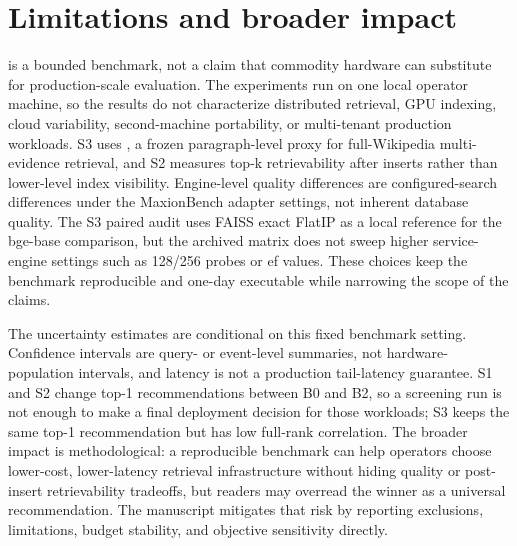 \section{Limitations and broader impact}

\sys is a bounded benchmark, not a claim that commodity hardware can substitute for production-scale evaluation. The experiments run on one local operator machine, so the results do not characterize distributed retrieval, GPU indexing, cloud variability, second-machine portability, or multi-tenant production workloads. S3 uses \hotpotmaxionbench{}, a frozen paragraph-level proxy for full-Wikipedia multi-evidence retrieval, and S2 measures top-k retrievability after inserts rather than lower-level index visibility. Engine-level quality differences are configured-search differences under the MaxionBench adapter settings, not inherent database quality. The S3 paired audit uses FAISS exact FlatIP as a local reference for the bge-base comparison, but the archived matrix does not sweep higher service-engine settings such as 128/256 probes or ef values. These choices keep the benchmark reproducible and one-day executable while narrowing the scope of the claims.

The uncertainty estimates are conditional on this fixed benchmark setting. Confidence intervals are query- or event-level summaries, not hardware-population intervals, and \maxrowp latency is not a production tail-latency guarantee. S1 and S2 change top-1 recommendations between B0 and B2, so a screening run is not enough to make a final deployment decision for those workloads; S3 keeps the same top-1 recommendation but has low full-rank correlation. The broader impact is methodological: a reproducible benchmark can help operators choose lower-cost, lower-latency retrieval infrastructure without hiding quality or post-insert retrievability tradeoffs, but readers may overread the winner as a universal recommendation. The manuscript mitigates that risk by reporting exclusions, limitations, budget stability, and objective sensitivity directly.
